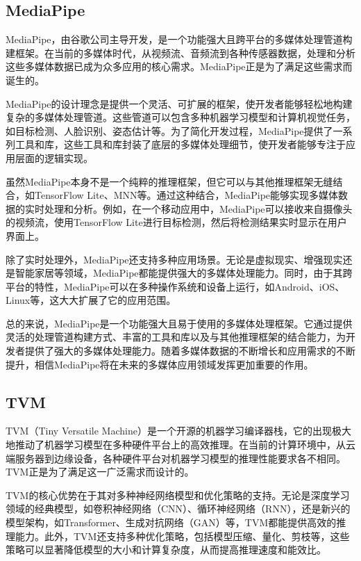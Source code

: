 \subsection{MediaPipe}

MediaPipe，由谷歌公司主导开发，是一个功能强大且跨平台的多媒体处理管道构建框架。在当前的多媒体时代，从视频流、音频流到各种传感器数据，处理和分析这些多媒体数据已成为众多应用的核心需求。MediaPipe正是为了满足这些需求而诞生的。

MediaPipe的设计理念是提供一个灵活、可扩展的框架，使开发者能够轻松地构建复杂的多媒体处理管道。这些管道可以包含多种机器学习模型和计算机视觉任务，如目标检测、人脸识别、姿态估计等。为了简化开发过程，MediaPipe提供了一系列工具和库，这些工具和库封装了底层的多媒体处理细节，使开发者能够专注于应用层面的逻辑实现。

虽然MediaPipe本身不是一个纯粹的推理框架，但它可以与其他推理框架无缝结合，如TensorFlow Lite、MNN等。通过这种结合，MediaPipe能够实现多媒体数据的实时处理和分析。例如，在一个移动应用中，MediaPipe可以接收来自摄像头的视频流，使用TensorFlow Lite进行目标检测，然后将检测结果实时显示在用户界面上。

除了实时处理外，MediaPipe还支持多种应用场景。无论是虚拟现实、增强现实还是智能家居等领域，MediaPipe都能提供强大的多媒体处理能力。同时，由于其跨平台的特性，MediaPipe可以在多种操作系统和设备上运行，如Android、iOS、Linux等，这大大扩展了它的应用范围。

总的来说，MediaPipe是一个功能强大且易于使用的多媒体处理框架。它通过提供灵活的处理管道构建方式、丰富的工具和库以及与其他推理框架的结合能力，为开发者提供了强大的多媒体处理能力。随着多媒体数据的不断增长和应用需求的不断提升，相信MediaPipe将在未来的多媒体应用领域发挥更加重要的作用。

\subsection{TVM}

TVM（Tiny Versatile Machine）是一个开源的机器学习编译器栈，它的出现极大地推动了机器学习模型在多种硬件平台上的高效推理。在当前的计算环境中，从云端服务器到边缘设备，各种硬件平台对机器学习模型的推理性能要求各不相同。TVM正是为了满足这一广泛需求而设计的。

TVM的核心优势在于其对多种神经网络模型和优化策略的支持。无论是深度学习领域的经典模型，如卷积神经网络（CNN）、循环神经网络（RNN），还是新兴的模型架构，如Transformer、生成对抗网络（GAN）等，TVM都能提供高效的推理能力。此外，TVM还支持多种优化策略，包括模型压缩、量化、剪枝等，这些策略可以显著降低模型的大小和计算复杂度，从而提高推理速度和能效比。

